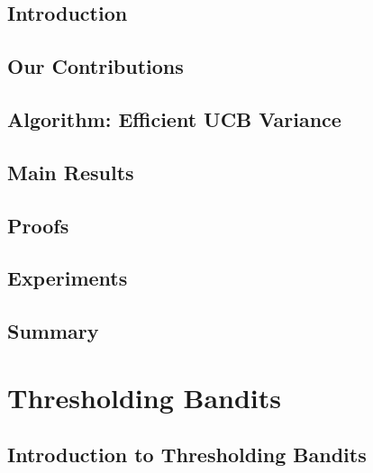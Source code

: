 \documentclass[MS]{iitmdiss}
\begin{document}
\section{Introduction}
\label{Chapter3:intro}



\section{Our Contributions}
\label{sec:contri}


\section{Algorithm: Efficient UCB Variance}
\label{sec:eucbv}


\section{Main Results} 
\label{sec:results}


\section{Proofs}
\label{sec:proofTheorem}


\section{Experiments}
\label{sec:expt}


\section{Summary}
\label{sec:conc}











\chapter{Thresholding Bandits}
\label{chap:tbandit1}

\section{Introduction to Thresholding Bandits}
\label{tbandit:intro1}

\end{document}
